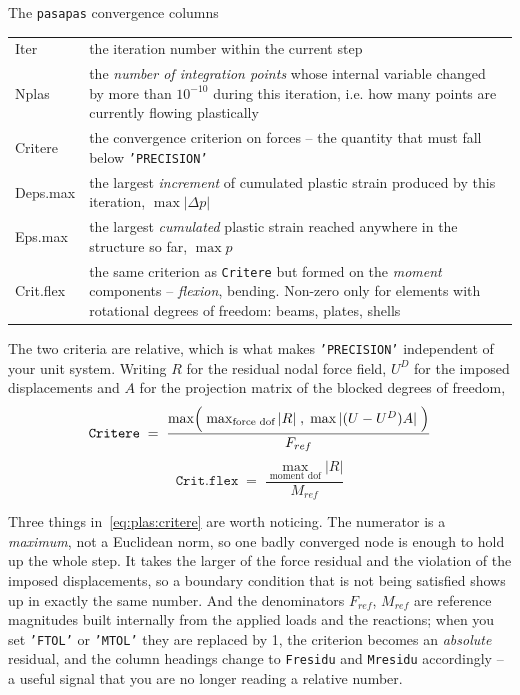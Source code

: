 %
%
\begin{gbox}{The \texttt{pasapas} convergence columns}
\begin{tabular}{@{}>{\ttfamily}l@{\hspace{5mm}}p{115mm}@{}}
Iter      & the iteration number within the current step \\[1.mm]
Nplas     & the \emph{number of integration points} whose internal variable
            changed by more than $10^{-10}$ during this iteration, i.e. how
            many points are currently flowing plastically \\[1.mm]
Critere   & the convergence criterion on forces -- the quantity that must
            fall below \texttt{'PRECISION'} \\[1.mm]
Deps.max  & the largest \emph{increment} of cumulated plastic strain produced
            by this iteration, $\max |\Delta p|$ \\[1.mm]
Eps.max   & the largest \emph{cumulated} plastic strain reached anywhere in
            the structure so far, $\max p$ \\[1.mm]
Crit.flex & the same criterion as \texttt{Critere} but formed on the
            \emph{moment} components -- \emph{flexion}, bending. Non-zero
            only for elements with rotational degrees of freedom: beams,
            plates, shells \\
\end{tabular}
\end{gbox}

\noindent The two criteria are relative, which is what makes
\texttt{'PRECISION'} independent of your unit system. Writing $R$ for the
residual nodal force field, $U^{D}$ for the imposed displacements and $A$ for
the projection matrix of the blocked degrees of freedom,
\begin{equation}
  \texttt{Critere} \;=\;
  \frac{\max\Bigl(\;\max_{\text{force dof}} |R| \;,\;
                   \max |(U-U^{D})A| \;\Bigr)}{F_{ref}}
\label{eq:plas:critere}
\end{equation}
\begin{equation}
  \texttt{Crit.flex} \;=\;
  \frac{\max_{\text{moment dof}} |R|}{M_{ref}}
\label{eq:plas:critflex}
\end{equation}

\noindent Three things in~\eqref{eq:plas:critere} are worth noticing. The
numerator is a \emph{maximum}, not a Euclidean norm, so one badly converged
node is enough to hold up the whole step. It takes the larger of the force
residual and the violation of the imposed displacements, so a boundary
condition that is not being satisfied shows up in exactly the same number.
And the denominators $F_{ref}$, $M_{ref}$ are reference magnitudes built
internally from the applied loads and the reactions; when you set
\texttt{'FTOL'} or \texttt{'MTOL'} they are replaced by 1, the criterion
becomes an \emph{absolute} residual, and the column headings change to
\texttt{Fresidu} and \texttt{Mresidu} accordingly -- a useful signal that
you are no longer reading a relative number.

